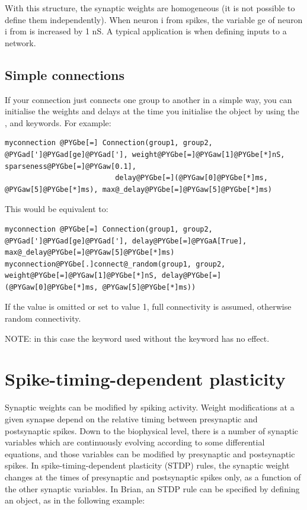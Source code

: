 \documentclass[letterpaper,10pt,english]{manual}
\begin{document}
With this structure, the synaptic weights are homogeneous (it is not possible to define them
independently). When neuron i from  spikes, the variable ge of neuron i from 
is increased by 1 nS. A typical application is when defining inputs to a network.


\subsection{Simple connections}

If your connection just connects one group to another in a simple way, you can initialise
the weights and delays at the time you initialise the \hyperlink{brian.Connection}{} object by using
the ,  and  keywords. For example:

\begin{Verbatim}[commandchars=@\[\]]
myconnection @PYGbe[=] Connection(group1, group2, @PYGad[']@PYGad[ge]@PYGad['], weight@PYGbe[=]@PYGaw[1]@PYGbe[*]nS, sparseness@PYGbe[=]@PYGaw[0.1],
                          delay@PYGbe[=](@PYGaw[0]@PYGbe[*]ms, @PYGaw[5]@PYGbe[*]ms), max@_delay@PYGbe[=]@PYGaw[5]@PYGbe[*]ms)
\end{Verbatim}

This would be equivalent to:

\begin{Verbatim}[commandchars=@\[\]]
myconnection @PYGbe[=] Connection(group1, group2, @PYGad[']@PYGad[ge]@PYGad['], delay@PYGbe[=]@PYGaA[True], max@_delay@PYGbe[=]@PYGaw[5]@PYGbe[*]ms)
myconnection@PYGbe[.]connect@_random(group1, group2, weight@PYGbe[=]@PYGaw[1]@PYGbe[*]nS, delay@PYGbe[=](@PYGaw[0]@PYGbe[*]ms, @PYGaw[5]@PYGbe[*]ms))
\end{Verbatim}

If the  value is omitted or set to value 1, full connectivity is assumed,
otherwise random connectivity.

NOTE: in this case the  keyword used without the  keyword has no effect.

\resetcurrentobjects


\section{Spike-timing-dependent plasticity}

Synaptic weights can be modified by spiking activity.
Weight modifications at a given synapse depend on the relative
timing between presynaptic and postsynaptic spikes. Down to the
biophysical level, there is a number of synaptic variables which
are continuously evolving according to some differential equations,
and those variables can be modified by presynaptic and postsynaptic
spikes. In spike-timing-dependent plasticity (STDP) rules, the synaptic weight
changes at the times of presynaptic and postsynaptic
spikes only, as a function of the other synaptic variables.
In Brian, an STDP rule can be specified by defining an
\hyperlink{brian.STDP}{} object, as in the following example:
\end{document}
